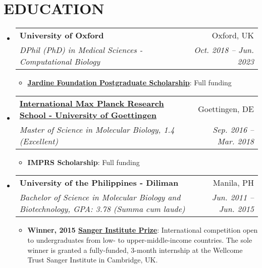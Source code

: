 \documentclass[legalpaper,11pt]{article}
\makeatletter
\newcommand{\resumeItem}[2]{
  \item\small{
    \textbf{#1}{: #2 \vspace{-2pt}}
  }
}
\newcommand{\resumeSubheading}[4]{
  \vspace{-1pt}\item
    \begin{tabular*}{0.97\textwidth}[t]{l@{\extracolsep{\fill}}r}
      \textbf{#1} & #2 \\
      \textit{\small#3} & \textit{\small #4} \\
    \end{tabular*}\vspace{-5pt}
}
\newcommand{\resumeSubHeadingListStart}{\begin{itemize}[leftmargin=*]}
\newcommand{\resumeSubHeadingListEnd}{\end{itemize}}
\newcommand{\resumeItemListStart}{\begin{itemize}}
\newcommand{\resumeItemListEnd}{\end{itemize}\vspace{-5pt}}
\makeatother
\begin{document}

\section{EDUCATION}
  \resumeSubHeadingListStart
    \resumeSubheading
      {University of Oxford}{Oxford, UK}
      {DPhil (PhD) in Medical Sciences - Computational Biology}{Oct. 2018 -- Jun. 2023}
      \resumeItemListStart
        \resumeItem{\href{https://www.jardines.com/en/sustainability/our-strategy/shaping-social-inclusion/jardine-foundation?tab=scholarship-schemes}{Jardine Foundation Postgraduate Scholarship}}
        {Full funding}
      \resumeItemListEnd
    \resumeSubheading
      {\href{https://uni-goettingen.de/en/663690.html}{International Max Planck Research School - University of Goettingen}}{Goettingen, DE}
      {Master of Science in Molecular Biology,  1.4 (Excellent)}{Sep. 2016 -- Mar. 2018}
      \resumeItemListStart
        \resumeItem{IMPRS Scholarship}
          {Full funding}
      \resumeItemListEnd
      \resumeSubheading
      {University of the Philippines - Diliman}{Manila, PH}
      {Bachelor of Science in Molecular Biology and Biotechnology, GPA: 3.78 (\textit{Summa cum laude})}{Jun. 2011 -- Jun. 2015}
       \resumeItemListStart
          \resumeItem{Winner, 2015 \href{https://www.sanger.ac.uk/about/study/the-sanger-prize/}{Sanger Institute Prize}}
          
          {International competition open to undergraduates from low- to upper-middle-income countries. The sole winner is granted a fully-funded, 3-month internship at the Wellcome Trust Sanger Institute in Cambridge, UK.}
      \resumeItemListEnd
  \resumeSubHeadingListEnd
  
  
\end{document}
